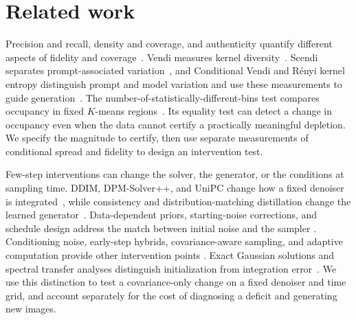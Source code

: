 \section{Related work}
\label{sec:related}
Precision and recall, density and coverage, and authenticity quantify
different aspects of fidelity and coverage~\cite{kynkaanniemi2019improved,naeem2020density,alaa2022faithful}.
Vendi measures kernel diversity~\cite{friedman2023vendi}. Scendi separates
prompt-associated variation~\cite{ospanov2025scendi}, and Conditional
Vendi and Rényi kernel entropy distinguish prompt and model variation
and use these measurements to guide generation~\cite{jalali2026conditional}.
The number-of-statistically-different-bins test compares occupancy in
fixed $K$-means regions~\cite{richardson2018ndb}. Its equality test can
detect a change in occupancy even when the data cannot certify a
practically meaningful depletion. We specify the magnitude to certify,
then use separate measurements of conditional spread and fidelity to
design an intervention test.

Few-step interventions can change the solver, the generator, or the
conditions at sampling time. DDIM, DPM-Solver++, and UniPC change how a
fixed denoiser is integrated~\cite{song2021ddim,lu2022dpmpp,zhao2023unipc},
while consistency and distribution-matching distillation change the
learned generator~\cite{luo2024lcm,luo2023lcmlora,yin2024dmd2}.
Data-dependent priors, starting-noise corrections, and schedule design
address the match between initial noise and the sampler
\cite{lee2022priorgrad,zheng2023truncated,hu2024onemore,lin2024flawed,sabour2024align}.
Conditioning noise, early-step hybrids, covariance-aware sampling, and
adaptive computation provide other intervention points
\cite{sadat2024cads,gandikota2026diversity,schioppa2026covariance,zhang2025adadiff,li2024budgetfusion,binici2026adsc}.
Exact Gaussian solutions and spectral transfer analyses distinguish
initialization from integration error~\cite{pierret2025gaussian,benita2025spectral}.
We use this distinction to test a covariance-only change on a fixed
denoiser and time grid, and account separately for the cost of diagnosing
a deficit and generating new images.
